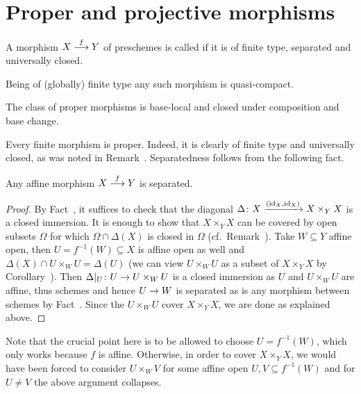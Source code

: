 \documentclass[a4paper,parskip=half,numbers=enddot, DIV=12]{scrreprt}
\begin{document}
\section{Proper and projective morphisms}
\begin{defi}
    A morphism $X\morphism[f] Y$ of preschemes is called  if it is of finite type, separated and universally closed.
\end{defi}
\begin{rem}
    \begin{alphanumerate}
    \item 
        Being of (globally) finite type any such morphism is quasi-compact.
    \item 
        The class of proper morphisms is base-local and closed under composition and base change.
    \end{alphanumerate}
\end{rem}
\begin{example}
    Every finite morphism is proper. Indeed, it is clearly of finite type and universally closed, as was noted in Remark~. Separatedness follows from the following fact.
\end{example}
\begin{fact}
	Any affine morphism $X\morphism[f]Y$ is separated.
\end{fact}
\begin{proof}
	By Fact~, it suffices to check that the diagonal $\Delta\colon X\xrightarrow{(\operatorname{id}_X,\operatorname{id}_X)}X\times_YX$ is a closed immersion. It is enough to show that $X\times_YX$ can be covered by open subsets $\Omega$ for which $\Omega\cap\Delta(X)$ is closed in $\Omega$ (cf.\ Remark~). Take $W\subseteq Y$ affine open, then $U=f^{-1}(W)\subseteq X$ is affine open as well and $\Delta(X)\cap U\times_WU=\Delta(U)$ (we can view $U\times_WU$ as a subset of $X\times_YX$ by Corollary~). Then $\Delta|_U\colon U\morphism U\times_WU$ is a closed immersion as $U$ and $U\times_WU$ are affine, thus schemes and hence $U\morphism W$ is separated as is any morphism between schemes by Fact~. 
	Since the $U\times_WU$ cover $X\times_YX$, we are done as explained above.
\end{proof}
Note that the crucial point here is to be allowed to choose $U=f^{-1}(W)$, which only works because $f$ is affine. Otherwise, in order to cover $X\times_YX$, we would have been forced to consider $U\times_WV$ for some affine open $U,V\subseteq f^{-1}(W)$ and for $U\neq V$ the above argument collapses.
\end{document}
